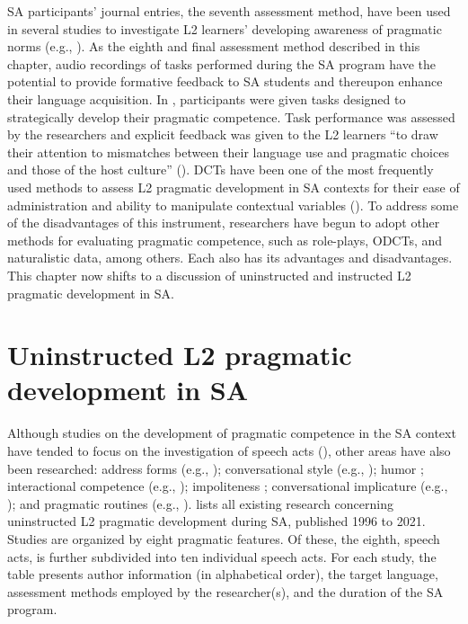 \documentclass[output=paper]{langscibook}
\begin{document}
SA participants’ journal entries, the seventh assessment method, have been used in several studies to investigate L2 learners’ developing awareness of pragmatic norms (e.g., \citealt{Dufon1999,Hernández2018b,Shively2011}). As the eighth and final assessment method described in this chapter, audio recordings of tasks performed during the SA program have the potential to provide formative feedback to SA students and thereupon enhance their language acquisition. In \citet{HernándezBoero2018a}, participants were given tasks designed to strategically develop their pragmatic competence. Task performance was assessed by the researchers and explicit feedback was given to the L2 learners “to draw their attention to mismatches between their language use and pragmatic choices and those of the host culture” (\citeyear[396]{Hernández2018a}). DCTs have been one of the most frequently used methods to assess L2 pragmatic development in SA contexts for their ease of administration and ability to manipulate contextual variables (\citealt{Félix-BrasdeferHasler-Barker2017,RockeyEtAl2020}). To address some of the disadvantages of this instrument, researchers have begun to adopt other methods for evaluating pragmatic competence, such as role-plays, ODCTs, and naturalistic data, among others. Each also has its advantages and disadvantages. This chapter now shifts to a discussion of uninstructed and instructed L2 pragmatic development in SA.

\section{Uninstructed L2 pragmatic development in SA}

  Although studies on the development of pragmatic competence in the SA context have tended to focus on the investigation of speech acts (\citealt{KasperDahl1991,Ren2018}), other areas have also been researched: address forms (e.g., \citealt{Dufon1999,Hassall2013,Hassall2015b,Hassall2015a}); conversational style (e.g., \citealt{Cordelia1996}); humor \citep{Shively2013}; interactional competence (e.g., \citealt{Dings2014,Masuda2011,Shively2015,Shively2016,Taguchi2014development}); impoliteness \citep{Félix-BrasdeferHasler-Barker2017}; conversational implicature (e.g., \citealt{Taguchi2008a, Taguchi2008b}); and pragmatic routines (e.g., \citealt{AlcónSolerSánchezHernández2017,Osuka2014}).  lists all existing research concerning uninstructed L2 pragmatic development during SA, published 1996 to 2021. Studies are organized by eight pragmatic features. Of these, the eighth, speech acts, is further subdivided into ten individual speech acts. For each study, the table presents author information (in alphabetical order), the target language, assessment methods employed by the researcher(s), and the duration of the SA program.
\end{document}
